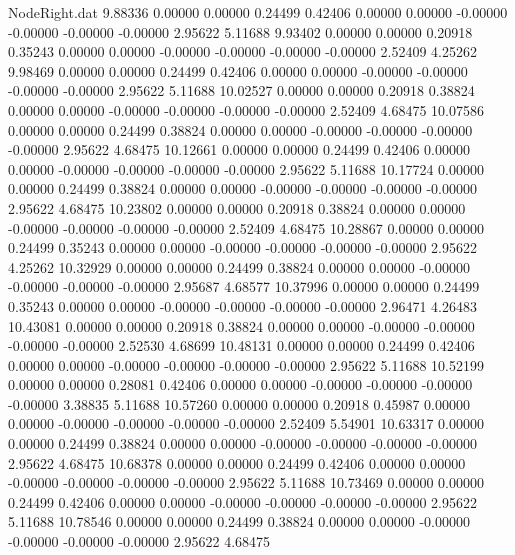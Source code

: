\begin{filecontents}{NodeRight.dat}
   9.88336    0.00000    0.00000     0.24499    0.42406    0.00000    0.00000   -0.00000   -0.00000   -0.00000   -0.00000    2.95622    5.11688
   9.93402    0.00000    0.00000     0.20918    0.35243    0.00000    0.00000   -0.00000   -0.00000   -0.00000   -0.00000    2.52409    4.25262
   9.98469    0.00000    0.00000     0.24499    0.42406    0.00000    0.00000   -0.00000   -0.00000   -0.00000   -0.00000    2.95622    5.11688
  10.02527    0.00000    0.00000     0.20918    0.38824    0.00000    0.00000   -0.00000   -0.00000   -0.00000   -0.00000    2.52409    4.68475
  10.07586    0.00000    0.00000     0.24499    0.38824    0.00000    0.00000   -0.00000   -0.00000   -0.00000   -0.00000    2.95622    4.68475
  10.12661    0.00000    0.00000     0.24499    0.42406    0.00000    0.00000   -0.00000   -0.00000   -0.00000   -0.00000    2.95622    5.11688
  10.17724    0.00000    0.00000     0.24499    0.38824    0.00000    0.00000   -0.00000   -0.00000   -0.00000   -0.00000    2.95622    4.68475
  10.23802    0.00000    0.00000     0.20918    0.38824    0.00000    0.00000   -0.00000   -0.00000   -0.00000   -0.00000    2.52409    4.68475
  10.28867    0.00000    0.00000     0.24499    0.35243    0.00000    0.00000   -0.00000   -0.00000   -0.00000   -0.00000    2.95622    4.25262
  10.32929    0.00000    0.00000     0.24499    0.38824    0.00000    0.00000   -0.00000   -0.00000   -0.00000   -0.00000    2.95687    4.68577
  10.37996    0.00000    0.00000     0.24499    0.35243    0.00000    0.00000   -0.00000   -0.00000   -0.00000   -0.00000    2.96471    4.26483
  10.43081    0.00000    0.00000     0.20918    0.38824    0.00000    0.00000   -0.00000   -0.00000   -0.00000   -0.00000    2.52530    4.68699
  10.48131    0.00000    0.00000     0.24499    0.42406    0.00000    0.00000   -0.00000   -0.00000   -0.00000   -0.00000    2.95622    5.11688
  10.52199    0.00000    0.00000     0.28081    0.42406    0.00000    0.00000   -0.00000   -0.00000   -0.00000   -0.00000    3.38835    5.11688
  10.57260    0.00000    0.00000     0.20918    0.45987    0.00000    0.00000   -0.00000   -0.00000   -0.00000   -0.00000    2.52409    5.54901
  10.63317    0.00000    0.00000     0.24499    0.38824    0.00000    0.00000   -0.00000   -0.00000   -0.00000   -0.00000    2.95622    4.68475
  10.68378    0.00000    0.00000     0.24499    0.42406    0.00000    0.00000   -0.00000   -0.00000   -0.00000   -0.00000    2.95622    5.11688
  10.73469    0.00000    0.00000     0.24499    0.42406    0.00000    0.00000   -0.00000   -0.00000   -0.00000   -0.00000    2.95622    5.11688
  10.78546    0.00000    0.00000     0.24499    0.38824    0.00000    0.00000   -0.00000   -0.00000   -0.00000   -0.00000    2.95622    4.68475

\end{filecontents}
